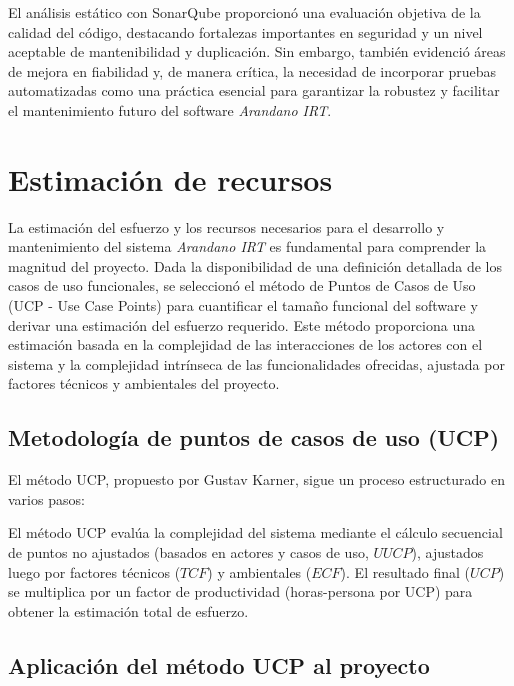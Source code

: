 El análisis estático con SonarQube proporcionó una evaluación objetiva de la calidad del código, destacando fortalezas importantes en seguridad y un nivel aceptable de mantenibilidad y duplicación. Sin embargo, también evidenció áreas de mejora en fiabilidad y, de manera crítica, la necesidad de incorporar pruebas automatizadas como una práctica esencial para garantizar la robustez y facilitar el mantenimiento futuro del software \textit{Arandano IRT}.


\section{Estimación de recursos}
\label{sec:estimacion_recursos}

La estimación del esfuerzo y los recursos necesarios para el desarrollo y mantenimiento del sistema \textit{Arandano IRT} es fundamental para comprender la magnitud del proyecto. Dada la disponibilidad de una definición detallada de los casos de uso funcionales, se seleccionó el método de Puntos de Casos de Uso (UCP - Use Case Points)  para cuantificar el tamaño funcional del software y derivar una estimación del esfuerzo requerido. Este método proporciona una estimación basada en la complejidad de las interacciones de los actores con el sistema y la complejidad intrínseca de las funcionalidades ofrecidas, ajustada por factores técnicos y ambientales del proyecto.

\subsection{Metodología de puntos de casos de uso (UCP)}
El método UCP, propuesto por Gustav Karner, sigue un proceso estructurado en varios pasos:

El método UCP evalúa la complejidad del sistema mediante el cálculo secuencial de puntos no ajustados (basados en actores y casos de uso, $UUCP$), ajustados luego por factores técnicos ($TCF$) y ambientales ($ECF$). El resultado final ($UCP$) se multiplica por un factor de productividad (horas-persona por UCP) para obtener la estimación total de esfuerzo.

\subsection{Aplicación del método UCP al proyecto}

